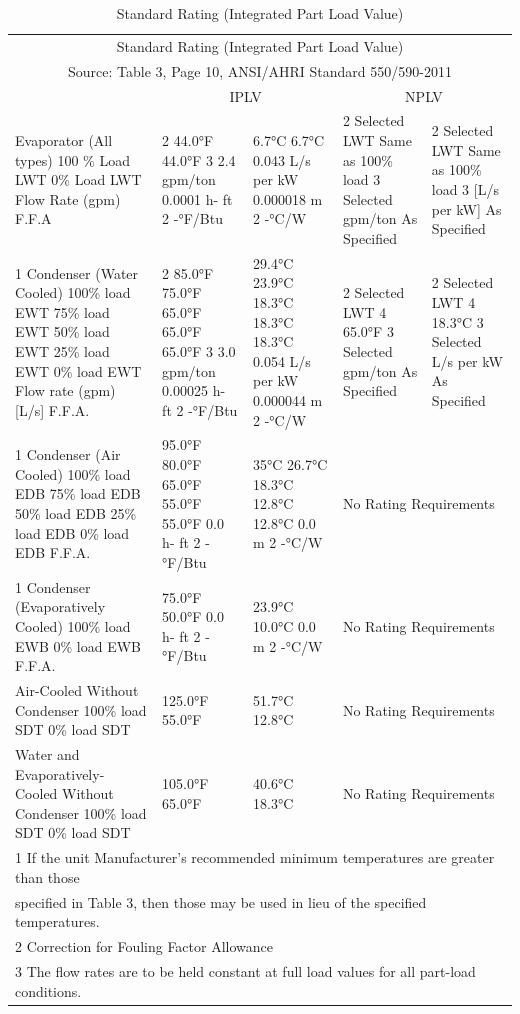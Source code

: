 \begin{longtable}[c]{p{1.2in}p{1.2in}p{1.2in}p{1.2in}p{1.2in}}
\caption{Standard Rating (Integrated Part Load Value) \protect \label{table:standard-rating-integrated-part-load-value}}\\
\toprule 
\multicolumn{5}{c}{Standard Rating (Integrated Part Load Value)} \tabularnewline
\multicolumn{5}{c}{Source: Table 3, Page 10, ANSI/AHRI Standard 550/590-2011} \tabularnewline \midrule
\endhead
 & \multicolumn{2}{c}{IPLV} & \multicolumn{2}{c}{NPLV} \tabularnewline
Evaporator (All types)  100 \% Load LWT  0\% Load LWT  Flow Rate (gpm)  F.F.A & 2 44.0°F  44.0°F  3 2.4 gpm/ton  0.0001  h- ft 2 -°F/Btu & 6.7°C  6.7°C  0.043 L/s per  kW  0.000018  m 2 -°C/W & 2 Selected LWT  Same as 100\%  load  3 Selected  gpm/ton  As Specified & 2 Selected  LWT  Same as 100\%  load  3 [L/s per kW]  As Specified \tabularnewline
1 Condenser (Water  Cooled)  100\% load EWT  75\% load EWT  50\% load EWT  25\% load EWT  0\% load EWT  Flow rate (gpm) [L/s]  F.F.A. & 2 85.0°F  75.0°F  65.0°F  65.0°F  65.0°F  3 3.0 gpm/ton  0.00025  h- ft 2 -°F/Btu & 29.4°C  23.9°C  18.3°C  18.3°C  18.3°C  0.054 L/s per  kW  0.000044  m 2 -°C/W & 2 Selected LWT  4 65.0°F  3 Selected  gpm/ton  As Specified & 2 Selected LWT  4 18.3°C  3 Selected  L/s per kW  As Specified \tabularnewline
1 Condenser (Air Cooled)  100\% load EDB  75\% load EDB  50\% load EDB  25\% load EDB  0\% load EDB  F.F.A. & 95.0°F  80.0°F  65.0°F  55.0°F  55.0°F  0.0 h- ft 2  -°F/Btu & 35°C  26.7°C  18.3°C  12.8°C  12.8°C  0.0 m 2 -°C/W & \multicolumn{2}{l}{No Rating Requirements} \tabularnewline
1 Condenser  (Evaporatively Cooled)  100\% load EWB  0\% load EWB  F.F.A. & 75.0°F  50.0°F  0.0 h- ft 2  -°F/Btu & 23.9°C  10.0°C  0.0 m 2 -°C/W & \multicolumn{2}{l}{No Rating Requirements} \tabularnewline
Air-Cooled Without  Condenser  100\% load SDT  0\% load SDT & 125.0°F  55.0°F & 51.7°C  12.8°C & \multicolumn{2}{l}{No Rating Requirements} \tabularnewline
Water and Evaporatively-  Cooled Without  Condenser  100\% load SDT  0\% load SDT & 105.0°F  65.0°F & 40.6°C  18.3°C & \multicolumn{2}{l}{No Rating Requirements} \tabularnewline
\multicolumn{5}{l}{1 If the unit Manufacturer’s recommended minimum temperatures are greater than those} \tabularnewline
\multicolumn{5}{l}{specified in  Table 3, then those may be used in lieu of the specified temperatures.} \tabularnewline
\multicolumn{5}{l}{2 Correction for Fouling Factor Allowance} \tabularnewline
\multicolumn{5}{l}{3 The flow rates are to be held constant at full load values for all part-load conditions.} \tabularnewline

\end{longtable}
